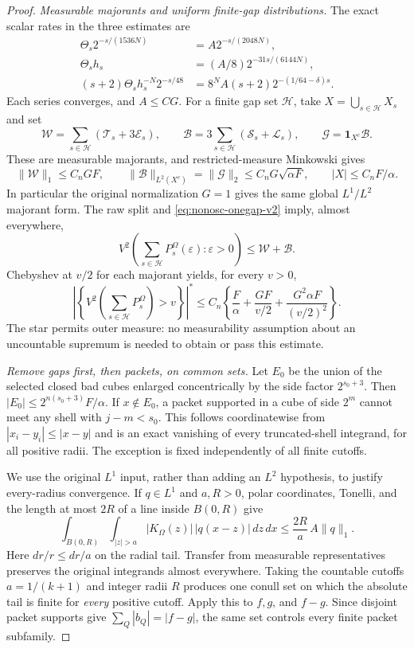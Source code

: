 \documentclass[11pt]{article}
\numberwithin{equation}{section}
\theoremstyle{remark}
\theoremstyle{definition}
\begin{document}
\begin{proof}
\smallskip
\noindent\emph{Measurable majorants and uniform finite-gap distributions.}
The exact scalar rates in the three estimates are
\begin{align*}
 \Theta_s2^{-s/(1536N)}&=A2^{-s/(2048N)},\\
 \Theta_sh_s&=(A/8)2^{-31s/(6144N)},\\
 (s+2)\Theta_sh_s^{-N}2^{-s/48}
 &=8^NA(s+2)2^{-(1/64-\delta)s}.
\end{align*}
Each series converges, and $A\le C G$.  For a finite gap set
$\mathcal H$, take $X=\bigcup_{s\in\mathcal H}X_s$ and set
\[
 \mathcal W=\sum_{s\in\mathcal H}(\mathcal T_s+3\mathcal E_s),\qquad
 \mathcal B=3\sum_{s\in\mathcal H}(\mathcal S_s+\mathcal L_s),\qquad
 \mathcal G=\mathbf1_{X^c}\mathcal B.
\]
These are measurable majorants, and restricted-measure Minkowski gives
\begin{equation}\label{eq:nonosc-global-majorants}
 \|\mathcal W\|_1\le C_nGF,\qquad
 \|\mathcal B\|_{L^2(X^c)}=\|\mathcal G\|_2
       \le C_nG\sqrt{\alpha F},\qquad
 |X|\le C_nF/\alpha.
\end{equation}
In particular the original normalization $G=1$ gives the same global
$L^1/L^2$ majorant form.  The raw split and
\eqref{eq:nonosc-onegap-v2} imply, almost everywhere,
\[
 V^2\left(\sum_{s\in\mathcal H}P_s^\Omega(\varepsilon):
                \varepsilon>0\right)\le\mathcal W+\mathcal B.
\]
Chebyshev at $v/2$ for each majorant yields, for every $v>0$,
\begin{equation}\label{eq:nonosc-finite-gap-distribution}
 \left|\left\{V^2\left(\sum_{s\in\mathcal H}P_s^\Omega\right)>v\right\}\right|^*
 \le C_n\left\{\frac F\alpha+\frac{GF}{v/2}
                         +\frac{G^2\alpha F}{(v/2)^2}\right\}.
\end{equation}
The star permits outer measure: no measurability assumption about an
uncountable supremum is needed to obtain or pass this estimate.

\smallskip
\noindent\emph{Remove gaps first, then packets, on common sets.}
Let $E_0$ be the union of the selected closed bad cubes enlarged concentrically
by the side factor $2^{s_0+3}$.  Then
$|E_0|\le2^{n(s_0+3)}F/\alpha$.  If $x\notin E_0$, a packet supported
in a cube of side $2^m$ cannot meet any shell with $j-m<s_0$.
This follows coordinatewise from $|x_i-y_i|\le|x-y|$ and is an exact
vanishing of every truncated-shell integrand, for all positive radii.
The exception is fixed independently of all finite cutoffs.

We use the original $L^1$ input, rather than adding an $L^2$ hypothesis,
to justify every-radius convergence.  If $q\in L^1$ and $a,R>0$, polar
coordinates, Tonelli, and the length at most $2R$ of a line inside
$B(0,R)$ give
\[
 \int_{B(0,R)}\int_{|z|>a}|K_\Omega(z)|\,|q(x-z)|\,dz\,dx
 \le \frac{2R}{a}\,A\|q\|_1.
\]
Here $dr/r\le dr/a$ on the radial tail.  Transfer from measurable
representatives preserves the original integrands almost everywhere.
Taking the countable cutoffs $a=1/(k+1)$ and integer radii $R$ produces
one conull set on which the absolute tail is finite for \emph{every}
positive cutoff.  Apply this to $f,g$, and $f-g$.
Since disjoint packet supports give
$\sum_Q|b_Q|=|f-g|$, the same set controls every finite packet subfamily.


\end{proof}
\end{document}
